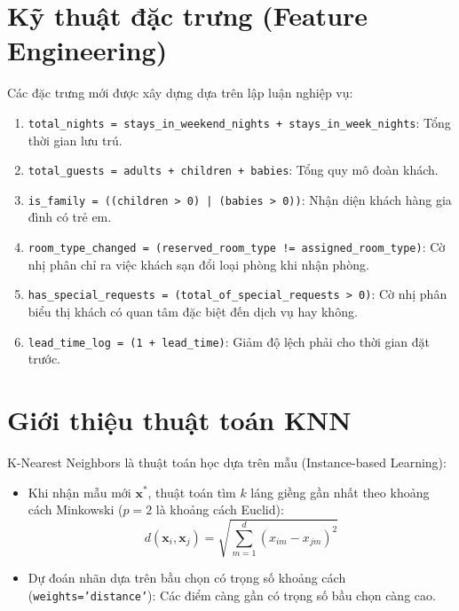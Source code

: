 \section{Kỹ thuật đặc trưng (Feature Engineering)}
Các đặc trưng mới được xây dựng dựa trên lập luận nghiệp vụ:
\begin{enumerate}
    \item \texttt{total\_nights = stays\_in\_weekend\_nights + stays\_in\_week\_nights}: Tổng thời gian lưu trú.
    \item \texttt{total\_guests = adults + children + babies}: Tổng quy mô đoàn khách.
    \item \texttt{is\_family = ((children > 0) | (babies > 0))}: Nhận diện khách hàng gia đình có trẻ em.
    \item \texttt{room\_type\_changed = (reserved\_room\_type != assigned\_room\_type)}: Cờ nhị phân chỉ ra việc khách sạn đổi loại phòng khi nhận phòng.
    \item \texttt{has\_special\_requests = (total\_of\_special\_requests > 0)}: Cờ nhị phân biểu thị khách có quan tâm đặc biệt đến dịch vụ hay không.
    \item \texttt{lead\_time\_log = \log(1 + lead\_time)}: Giảm độ lệch phải cho thời gian đặt trước.
\end{enumerate}

\section{Giới thiệu thuật toán KNN}
K-Nearest Neighbors là thuật toán học dựa trên mẫu (Instance-based Learning):
\begin{itemize}
    \item Khi nhận mẫu mới $\mathbf{x}^*$, thuật toán tìm $k$ láng giềng gần nhất theo khoảng cách Minkowski ($p=2$ là khoảng cách Euclid):
    \begin{equation}
        d(\mathbf{x}_i, \mathbf{x}_j) = \sqrt{\sum_{m=1}^d (x_{im} - x_{jm})^2}
    \end{equation}
    \item Dự đoán nhãn dựa trên bầu chọn có trọng số khoảng cách (\texttt{weights='distance'}): Các điểm càng gần có trọng số bầu chọn càng cao.
\end{itemize}

